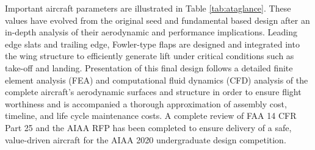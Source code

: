 Important aircraft parameters are illustrated in Table \ref{tab:ataglance}.  These values have evolved from the original seed and fundamental based design after an in-depth analysis of their aerodynamic and performance implications.  Leading edge slats and trailing edge,  Fowler-type flaps are designed and integrated into the wing structure to efficiently generate lift under critical conditions such as take-off and landing.  Presentation of this final design follows a detailed finite element analysis (FEA) and computational fluid dynamics (CFD) analysis of the complete aircraft's aerodynamic surfaces and structure in order to ensure flight worthiness and is accompanied a thorough approximation of assembly cost, timeline, and life cycle maintenance costs.  A complete review of FAA 14 CFR Part 25 \cite{cfr} and the AIAA RFP \cite{RFP} has been completed to ensure delivery of a safe, value-driven aircraft for the AIAA 2020 undergraduate design competition.





